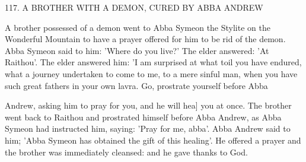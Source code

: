 117.
A BROTHER WITH A DEMON,
CURED BY ABBA ANDREW

A brother possessed of a demon went to Abba Symeon the Stylite
on the Wonderful Mountain to have a prayer offered for him to be
rid of the demon.
Abba Symeon said to him: 'Where do you live?'
The elder answered: 'At Raithou'.
The elder answered him: 'I am
surprised at what toil you have endured, what a journey undertaken
to come to me, to a mere sinful man, when you have such great
fathers in your own lavra.
Go, prostrate yourself before Abba

Andrew, asking him to pray for you, and he will hea] you at once.
The brother went back to Raithou and prostrated himself before
Abba Andrew, as Abba Symeon had instructed him, saying: 'Pray
for me, abba'.
Abba Andrew said to him; 'Abba Symeon has
obtained the gift of this healing'.
He offered a prayer and the
brother was immediately cleansed: and he gave thanks to God.

